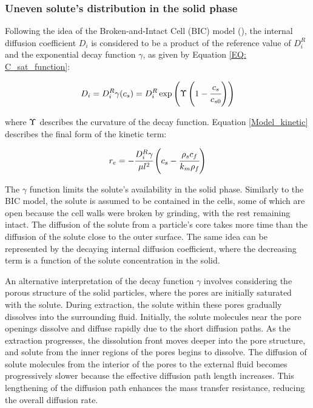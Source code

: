 \documentclass[../Article_Model_Parameters.tex]{subfiles}
\begin{document}
	
	\subsubsection{Uneven solute's distribution in the solid phase} \label{CH: Gamma_Function}
	
	Following the idea of the Broken-and-Intact Cell (BIC) model (\citet{Sovova2017}), the internal diffusion coefficient $D_i$ is considered to be a product of the reference value of $D_i^R$ and the exponential decay function $\gamma$, as given by Equation \ref{EQ: C_sat_function}:
	
	{\footnotesize
		\begin{equation}
			D_i = D_i^R \gamma(c_s) = D_i^R \exp \left( \Upsilon \left( 1-\cfrac{ c_s }{c_{s0}} \right) \right) \label{EQ: C_sat_function}
	\end{equation} }
	
	where  ${\color{black}\Upsilon}$ describes the curvature of the decay function. Equation \ref{Model_kinetic} describes the final form of the kinetic term:
	
	{\footnotesize
		\begin{equation}
			\label{Model_kinetic}
			r_e = -\cfrac{D_i^R \gamma }{ \mu l^2 } \left( c_s  - \cfrac{\rho_s c_f }{ k_m \rho_f }  \right)
	\end{equation} }
	
	The $\gamma$ function limits the solute's availability in the solid phase. Similarly to the BIC model, the solute is assumed to be contained in the cells, some of which are open because the cell walls were broken by grinding, with the rest remaining intact. The diffusion of the solute from a particle's core takes more time than the diffusion of the solute close to the outer surface. The same idea can be represented by the decaying internal diffusion coefficient, where the decreasing term is a function of the solute concentration in the solid. 
	
	An alternative interpretation of the decay function $\gamma$ involves considering the porous structure of the solid particles, where the pores are initially saturated with the solute. During extraction, the solute within these pores gradually dissolves into the surrounding fluid. Initially, the solute molecules near the pore openings dissolve and diffuse rapidly due to the short diffusion paths. As the extraction progresses, the dissolution front moves deeper into the pore structure, and solute from the inner regions of the pores begins to dissolve. The diffusion of solute molecules from the interior of the pores to the external fluid becomes progressively slower because the effective diffusion path length increases. This lengthening of the diffusion path enhances the mass transfer resistance, reducing the overall diffusion rate. 
	
\end{document}
